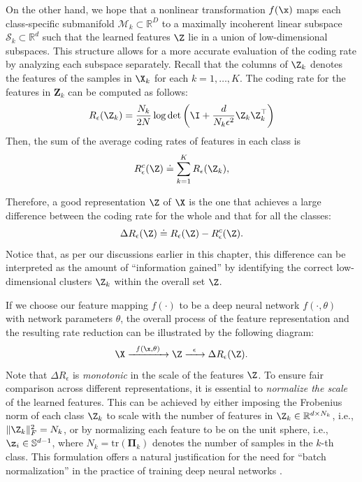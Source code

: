 \documentclass[../../book-main.tex]{subfiles}
\begin{document}
On the other hand, we hope that a nonlinear transformation $f(\x)$ maps each class-specific submanifold $\mathcal{M}_k \subset \mathbb{R}^D$ to a maximally incoherent linear subspace $\mathcal{S}_k \subset \mathbb{R}^d$ such that the learned features $\Z$ lie in a union of low-dimensional subspaces. This structure allows for a more accurate evaluation of the coding rate by analyzing each subspace separately. %
Recall that the columns of $\Z_k$ denotes the features of the samples in $\X_k$ for each $k=1,\dots,K$. The coding rate for the features in $\bm Z_k$ can be computed as follows: 
\begin{align}
    R_{\epsilon}(\Z_k) = \frac{N_k}{2N}\log\det\left(\I + \frac{d}{N_k\epsilon^{2}}\Z_k\Z_k^{\top}\right)
\end{align}
Then, the sum of the average coding rates of features in each class is 
\begin{equation}
	 R_{\epsilon}^c(\Z) \doteq \sum_{k=1}^K R_{\epsilon}(\Z_k),
	\label{chap4-eqn:compress-loss-eval}
\end{equation}

Therefore, a good representation $\Z$ of $\X$ is the one that achieves a large difference between the coding rate for the whole and that for all the classes:
\begin{equation}
	\Delta R_{\epsilon}(\Z) \doteq R_{\epsilon}(\Z) - R_{\epsilon}^c(\Z).
	\label{chap4-eqn:coding-length-reduction}
\end{equation}
Notice that, as per our discussions earlier in this chapter, this difference can be interpreted as the amount of ``information gained'' by identifying the correct low-dimensional clusters $\Z_k$ within the overall set $\Z$.

If we choose our feature mapping $f(\cdot)$ to be a deep neural network $f(\cdot,\theta)$ with network parameters $\theta$, the overall process of the feature representation and the resulting rate reduction  can be illustrated by the following diagram:
\begin{equation}
	\X
	\xrightarrow{\hspace{2mm} f(\x, \theta)\hspace{2mm}} \Z  \xrightarrow{\hspace{2mm} \epsilon \hspace{2mm}} \Delta R_{\epsilon}(\Z).
	\label{chap4-eqn:flow}
\end{equation}
Note that $\Delta R_{\epsilon}$ is {\em monotonic} in the scale of the features $\Z$. To ensure fair comparison across different representations, it is essential to {\em normalize the scale} of the learned features. This can be achieved by either imposing the Frobenius norm of each class $\Z_k$ to scale with the number of features in $\Z_k \in \mathbb R^{d \times N_k}$, i.e., $\|\Z_k\|_F^2 = N_k$, or by normalizing each feature to be on the unit sphere, i.e., $\z_i \in \mathbb{S}^{d-1}$, where $N_k=\mathrm{tr}(\bm \Pi_k)$ denotes the number of samples in the $k$-th class. This formulation offers a natural justification for the need for ``batch normalization'' in the practice of
training deep neural networks \cite{ioffe2015batch}. %
\end{document}
